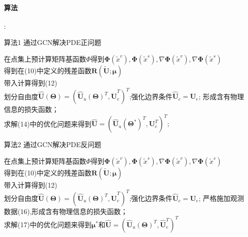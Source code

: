 \paragraph*{算法}:\\
\begin{algorithm}
\caption{算法1 通过GCN解决PDE正问题} 
在点集上预计算矩阵基函数$\Phi$得到$ \boldsymbol{\Phi}\left(\tilde{x}^{v}\right), \boldsymbol{\Phi}\left(\tilde{x}^{s}\right), \nabla \boldsymbol{\Phi}\left(\tilde{x}^{v}\right), \nabla \boldsymbol{\Phi}\left(\tilde{x}^{s}\right)$\\
得到在(10)中定义的残差函数$\boldsymbol{R}(\tilde{\boldsymbol{U}};\boldsymbol{\mu}) $\\
带入计算得到(12)\\
划分自由度$\hat{\boldsymbol{U}}(\boldsymbol{\Theta})=\left(\hat{\boldsymbol{U}}_{u}(\boldsymbol{\Theta})^{T}, \hat{\boldsymbol{U}}_{c}^{T}\right)^{T}$;强化边界条件$\hat{\boldsymbol{U}}_{c}=\boldsymbol{U}_{e}$;
形成含有物理信息的损失函数；\\
求解(14)中的优化问题来得到$\hat{\boldsymbol{U}}=\left(\hat{\boldsymbol{U}}_{u}\left(\boldsymbol{\Theta}^{*}\right)^{T}, \boldsymbol{U}_{e}^{T}\right)^{T};$
\end{algorithm}

\begin{algorithm}
    \caption{算法2 通过GCN解决PDE反问题} 
    在点集上预计算矩阵基函数$\Phi$得到$ \boldsymbol{\Phi}\left(\tilde{x}^{v}\right), \boldsymbol{\Phi}\left(\tilde{x}^{s}\right), \nabla \boldsymbol{\Phi}\left(\tilde{x}^{v}\right), \nabla \boldsymbol{\Phi}\left(\tilde{x}^{s}\right)$\\
    得到在(10)中定义的残差函数$\boldsymbol{R}(\tilde{\boldsymbol{U}};\boldsymbol{\mu}) $\\
    带入计算得到(12)\\
    划分自由度$\hat{\boldsymbol{U}}(\boldsymbol{\Theta})=\left(\hat{\boldsymbol{U}}_{u}(\boldsymbol{\Theta})^{T}, \hat{\boldsymbol{U}}_{c}^{T}\right)^{T}$;强化边界条件$\hat{\boldsymbol{U}}_{c}=\boldsymbol{U}_{e}$;
    严格施加观测数据(16),形成含有物理信息的损失函数；\\
    求解(17)中的优化问题来得到$\boldsymbol{\mu}^*$和$\hat{\boldsymbol{U}}=\left(\hat{\boldsymbol{U}}_{u}(\boldsymbol{\Theta})^{T}, \hat{\boldsymbol{U}}_{e}^{T}\right)^{T}$

\end{algorithm}

